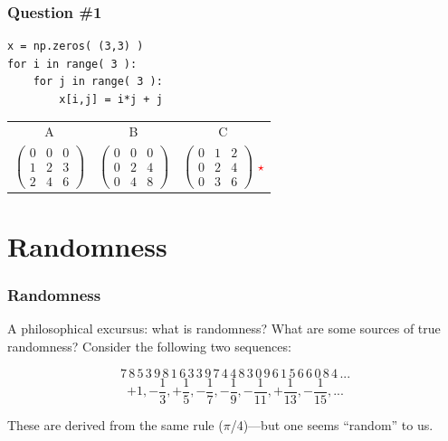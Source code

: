 \documentclass[11pt]{beamer}
\newcommand{\correctstar}{\textcolor{red}{$\star$}}
\begin{document}
\begin{frame}[fragile]
  \frametitle{Question \#1}
  \Enlarge

  \begin{Verbatim}
x = np.zeros( (3,3) )
for i in range( 3 ):
    for j in range( 3 ):
        x[i,j] = i*j + j
  \end{Verbatim}

  \begin{center}
  \begin{tabular}{ccc}
    A & B & C \\
    $
    \left(
    \begin{array}{ccc}
    0 & 0 & 0 \\
    1 & 2 & 3 \\
    2 & 4 & 6
    \end{array}
    \right)
    $ &
    $
    \left(
    \begin{array}{ccc}
    0 & 0 & 0 \\
    0 & 2 & 4 \\
    0 & 4 & 8
    \end{array}
    \right)
    $ &
    $
    \left(
    \begin{array}{ccc}
    0 & 1 & 2 \\
    0 & 2 & 4 \\
    0 & 3 & 6
    \end{array}
    \right)
    $ \correctstar
  \end{tabular}
  \end{center}
\end{frame}


\section{Randomness}

\begin{frame}[fragile]
  \frametitle{Randomness}
  \Enlarge

  \begin{enumerate}
  \myitem  A philosophical excursus:  what is randomness? %
  \myitem  What are some sources of true randomness? %
  \myitem  Consider the following two sequences:
  \end{enumerate}
  $$
  7\,8\,5\,3\,9\,8\,1\,6\,3\,3\,9\,7\,4\,4\,8\,3\,0\,9\,6\,1\,5\,6\,6\,0\,8\,4\,...
  $$
  $$
  +1, -\frac{1}{3}, +\frac{1}{5}, -\frac{1}{7}, -\frac{1}{9}, -\frac{1}{11}, +\frac{1}{13}, -\frac{1}{15}, ...
  $$  %
  \begin{enumerate}
  \myitem  These are derived from the same rule ($\pi$/4)---but one seems ``random'' to us.
  \end{enumerate}
\end{frame}
\end{document}
